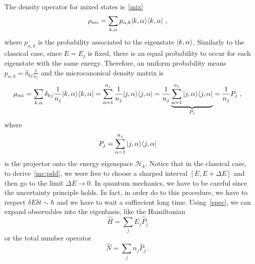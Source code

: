     The density operator for mixed states is~\eqref{mix}
    \begin{equation*}
        \rho_{mc} = \sum_{k, \alpha} p_{\alpha, k} \vert k, \alpha\rangle \langle k, \alpha\vert ~,
    \end{equation*}
    where $p_{\alpha, k}$ is the probability associated to the eigenstate $\vert k, \alpha\rangle$. 
    Similarly to the classical case, since $E = E_j$ is fixed, there is an equal probability to occur for each eigenstate with the same energy. Therefore, an uniform probability means $p_{\alpha, k} = \delta_{k j} \frac{1}{n_j}$ and the microcanonical density matrix is
    \begin{equation*}
        \rho_{mc} = \sum_{k, \alpha} \delta_{k j} \frac{1}{n_j} \vert k, \alpha\rangle \langle k, \alpha\vert = \sum_{\alpha = 1}^{n_j} \frac{1}{n_j} \vert j, \alpha\rangle \langle j, \alpha\vert =  \frac{1}{n_j} \underbrace{ \sum_{\alpha = 1}^{n_j} \vert j, \alpha\rangle \langle j, \alpha\vert}_{P_j} = \frac{1}{n_j} P_j ~,
    \end{equation*}
    where 
    \begin{equation*}
        P_j = \sum_{\alpha=1}^{n_j} \vert j, \alpha\rangle \langle j, \alpha\vert
    \end{equation*} 
    is the projector onto the energy eigenspace $\mathcal H_k$. 
    Notice that in the classical case, to derive~\eqref{mc:pdd}, we were free to choose a sharped interval $[E, E + \Delta E]$ and then go to the limit $\Delta E \rightarrow 0$. In quantum mechanics, we have to be careful since the uncertainty principle holds. In fact, in order do to this procedure, we have to respect $\delta E \delta t \sim \hbar$ and we have to wait a suffiecient long time.
    Using~\eqref{spec}, we can expand observables into the eigenbasis, like the Hamiltonian
    \begin{equation}\label{endec}
        \hat H = \sum_j E_j \hat P_j 
    \end{equation}
    or the total number operator 
    \begin{equation}\label{numb}
        \hat N = \sum_j n_j \hat P_j ~.
    \end{equation}

